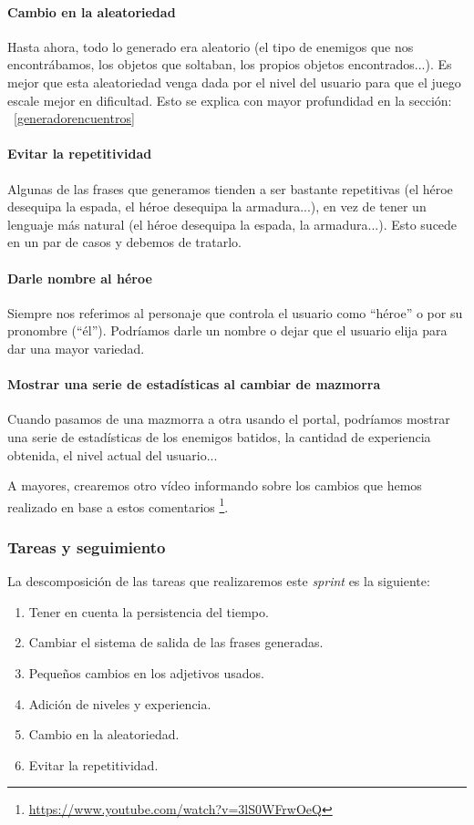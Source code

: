 \paragraph{Cambio en la aleatoriedad} Hasta ahora, todo lo generado era aleatorio (el tipo de enemigos que nos encontrábamos, los objetos que soltaban, los propios objetos encontrados...). Es mejor que esta aleatoriedad venga dada por el nivel del usuario para que el juego escale mejor en dificultad. Esto se explica con mayor profundidad en la sección: ~\ref{generadorencuentros}

\paragraph{Evitar la repetitividad} Algunas de las frases que generamos tienden a ser bastante repetitivas (el héroe desequipa la espada, el héroe desequipa la armadura...), en vez de tener un lenguaje más natural (el héroe desequipa la espada, la armadura...). Esto sucede en un par de casos y debemos de tratarlo.

\paragraph{Darle nombre al héroe} Siempre nos referimos al personaje que controla el usuario como ``héroe'' o por su pronombre (``él''). Podríamos darle un nombre o dejar que el usuario elija para dar una mayor variedad.

\paragraph{Mostrar una serie de estadísticas al cambiar de mazmorra} Cuando pasamos de una mazmorra a otra usando el portal, podríamos mostrar una serie de estadísticas de los enemigos batidos, la cantidad de experiencia obtenida, el nivel actual del usuario...

A mayores, crearemos otro vídeo informando sobre los cambios que hemos realizado en base a estos comentarios \footnote{\url{https://www.youtube.com/watch?v=3lS0WFrwOeQ}}.

\subsubsection{Tareas y seguimiento}

La descomposición de las tareas que realizaremos este \textit{sprint} es la siguiente:

\begin{enumerate}[label=\bfseries WBS 8.\arabic*]
  \item Tener en cuenta la persistencia del tiempo.
  \item Cambiar el sistema de salida de las frases generadas.
  \item Pequeños cambios en los adjetivos usados.
  \item Adición de niveles y experiencia.
  \item Cambio en la aleatoriedad.
  \item Evitar la repetitividad.
\end{enumerate}

